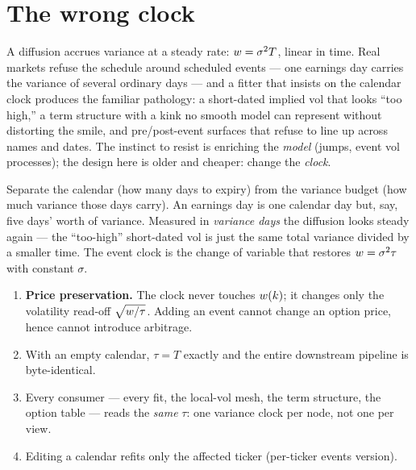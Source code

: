 \documentclass[11pt]{article}
\begin{document}
\newpage
\tableofcontents
\newpage

\section{The wrong clock}
\label{sec:wrong}

A diffusion accrues variance at a steady rate: $w=\sigma^{2}T$,
linear in time.  Real markets refuse the schedule around scheduled
events --- one earnings day carries the variance of several ordinary
days --- and a fitter that insists on the calendar clock produces the
familiar pathology: a short-dated implied vol that looks ``too high,''
a term structure with a kink no smooth model can represent without
distorting the smile, and pre/post-event surfaces that refuse to line
up across names and dates.  The instinct to resist is enriching the
\emph{model} (jumps, event vol processes); the design here is older and
cheaper: change the \emph{clock}.

\begin{heuristic}
Separate the calendar (how many days to expiry) from the variance
budget (how much variance those days carry).  An earnings day is one
calendar day but, say, five days' worth of variance.  Measured in
\emph{variance days} the diffusion looks steady again --- the
``too-high'' short-dated vol is just the same total variance divided by
a smaller time.  The event clock is the change of variable that
restores $w=\sigma^{2}\tau$ with constant $\sigma$.
\end{heuristic}

\begin{invariant}
\begin{enumerate}[leftmargin=1.6em]
\item \textbf{Price preservation.}  The clock never touches $w(k)$;
it changes only the volatility read-off $\sqrt{w/\tau}$.  Adding an
event cannot change an option price, hence cannot introduce arbitrage.
\item With an empty calendar, $\tau=T$ exactly and the entire
downstream pipeline is byte-identical.
\item Every consumer --- every fit, the local-vol mesh, the term
structure, the option table --- reads the \emph{same} $\tau$: one
variance clock per node, not one per view.
\item Editing a calendar refits only the affected ticker (per-ticker
events version).
\end{enumerate}
\end{invariant}
\end{document}
